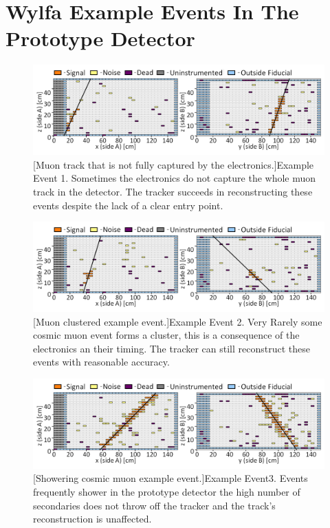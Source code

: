 
\chapter{Wylfa Example Events In The Prototype Detector}

\begin{figure}[htbp]
 \centering
 \includegraphics[width=\linewidth]{Appendix6/Figs/wylfaEg1MedText.png}
 [Muon track that is not fully captured by the electronics.]{Example Event 1. Sometimes the electronics do not capture the whole muon track in the detector. The tracker succeeds in reconstructing these events despite the lack of a clear entry point.} 
 \label{fig:wylfaEg1}
\end{figure}

\begin{figure}[htbp]
 \centering
 \includegraphics[width=\linewidth]{Appendix6/Figs/wylfaEg2MedText.png}
 [Muon clustered example event.]{Example Event 2. Very Rarely some cosmic muon event forms a cluster, this is a consequence of the electronics an their timing. The tracker can still reconstruct these events with reasonable accuracy.} 
 \label{fig:wylfaEg2}
\end{figure}

\begin{figure}[htbp]
 \centering
 \includegraphics[width=\linewidth]{Appendix6/Figs/wylfaEg3MedText.png}
 [Showering cosmic muon example event.]{Example Event3. Events frequently shower in the prototype detector the high number of secondaries does not throw off the tracker and the track's reconstruction is unaffected.} 
 \label{fig:wylfaEg3}
\end{figure}

